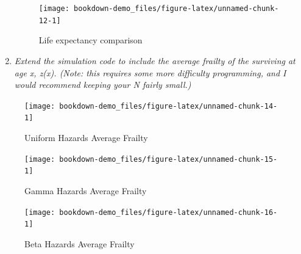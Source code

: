 \documentclass[]{book}
\begin{document}
\begin{enumerate}
  \begin{figure}
   \texttt{[image: bookdown-demo\_files/figure-latex/unnamed-chunk-12-1]} \caption{Life expectancy comparison}\label{fig:unnamed-chunk-12}
   \end{figure}
\item
  \emph{Extend the simulation code to include the average frailty of the surviving at age x, z(x). (Note: this requires some more difficulty programming, and I would recommend keeping your N fairly small.)}
\end{enumerate}

\begin{figure}
\texttt{[image: bookdown-demo\_files/figure-latex/unnamed-chunk-14-1]} \caption{Uniform Hazards Average Frailty}\label{fig:unnamed-chunk-14}
\end{figure}
\begin{figure}
\texttt{[image: bookdown-demo\_files/figure-latex/unnamed-chunk-15-1]} \caption{Gamma Hazards Average Frailty}\label{fig:unnamed-chunk-15}
\end{figure}
\begin{figure}
\texttt{[image: bookdown-demo\_files/figure-latex/unnamed-chunk-16-1]} \caption{Beta Hazards Average Frailty}\label{fig:unnamed-chunk-16}
\end{figure}
\end{document}
